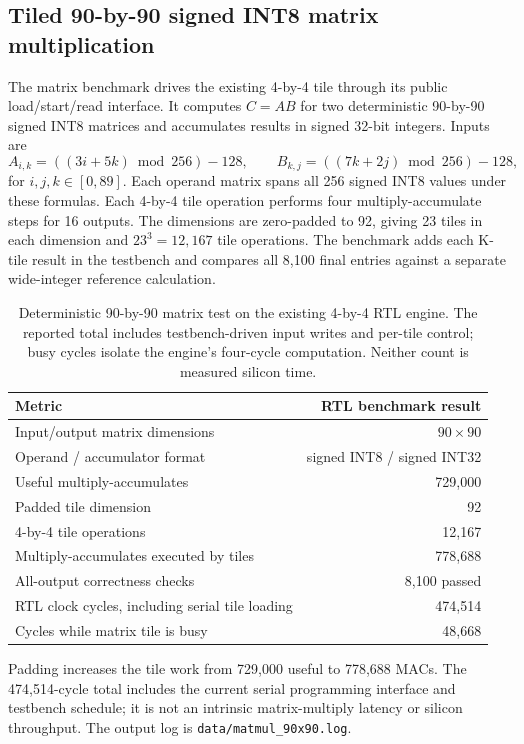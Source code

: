 \documentclass[10pt,a4paper]{article}
\begin{document}
\subsection{Tiled 90-by-90 signed INT8 matrix multiplication}

The matrix benchmark drives the existing 4-by-4 tile through its public
load/start/read interface. It computes \(C=A B\) for two deterministic
90-by-90 signed INT8 matrices and accumulates results in signed 32-bit
integers. Inputs are
\[
A_{i,k}=((3i+5k)\bmod256)-128,\qquad
B_{k,j}=((7k+2j)\bmod256)-128,
\]
for \(i,j,k\in[0,89]\). Each operand matrix spans all 256 signed INT8
values under these formulas. Each 4-by-4 tile operation performs four
multiply-accumulate steps for 16 outputs. The dimensions are zero-padded to
92, giving 23 tiles in each dimension and \(23^3=12{,}167\) tile operations.
The benchmark adds each K-tile result in the testbench and compares all
8,100 final entries against a separate wide-integer reference calculation.

\begin{table}[!htbp]
\centering
\small
\begin{tabular}{lr}
\toprule
Metric & RTL benchmark result\\
\midrule
Input/output matrix dimensions & \(90\times90\)\\
Operand / accumulator format & signed INT8 / signed INT32\\
Useful multiply-accumulates & 729,000\\
Padded tile dimension & 92\\
4-by-4 tile operations & 12,167\\
Multiply-accumulates executed by tiles & 778,688\\
All-output correctness checks & 8,100 passed\\
RTL clock cycles, including serial tile loading & 474,514\\
Cycles while matrix tile is busy & 48,668\\
\bottomrule
\end{tabular}
\caption{Deterministic 90-by-90 matrix test on the existing 4-by-4 RTL
engine. The reported total includes testbench-driven input writes and
per-tile control; busy cycles isolate the engine's four-cycle computation.
Neither count is measured silicon time.}
\label{tab:matmul90}
\end{table}

Padding increases the tile work from 729,000 useful to 778,688 MACs. The
474,514-cycle total includes the current serial programming interface and
testbench schedule; it is not an intrinsic matrix-multiply latency or
silicon throughput. The output log is
\texttt{data/matmul\_90x90.log}.
\end{document}
